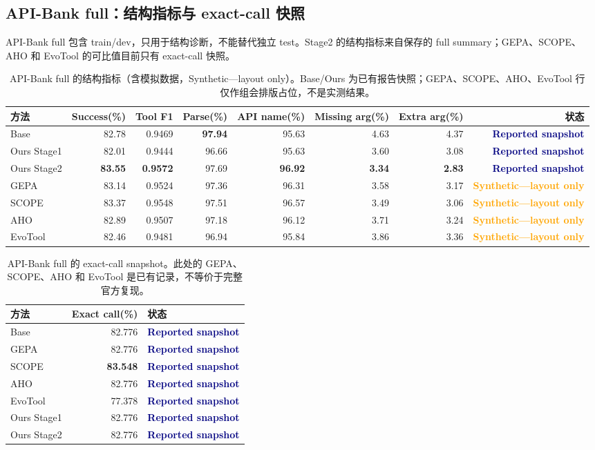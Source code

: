 \documentclass[a4paper,11pt]{article}
\newcommand{\reported}{\textcolor{navy}{\textbf{Reported snapshot}}}
\newcommand{\layoutonly}{\textcolor{orange}{\textbf{Synthetic---layout only}}}
\begin{document}
\begin{CJK*}{UTF8}{gbsn}
\subsection{API-Bank full：结构指标与 exact-call 快照}

API-Bank full 包含 train/dev，只用于结构诊断，不能替代独立 test。Stage2 的结构指标来自保存的 full summary；GEPA、SCOPE、AHO 和 EvoTool 的可比值目前只有 exact-call 快照。

\begin{table}[H]
\centering\scriptsize
\caption{API-Bank full 的结构指标（含模拟数据，Synthetic---layout only）。Base/Ours 为已有报告快照；GEPA、SCOPE、AHO、EvoTool 行仅作组会排版占位，不是实测结果。}
\begin{adjustbox}{max width=\textwidth}
\begin{tabular}{lrrrrrrr}
\toprule
方法 & Success(\%) & Tool F1 & Parse(\%) & API name(\%) & Missing arg(\%) & Extra arg(\%) & 状态\\
\midrule
Base & 82.78 & 0.9469 & \textbf{97.94} & 95.63 & 4.63 & 4.37 & \reported\\
Ours Stage1 & 82.01 & 0.9444 & 96.66 & 95.63 & 3.60 & 3.08 & \reported\\
Ours Stage2 & \textbf{83.55} & \textbf{0.9572} & 97.69 & \textbf{96.92} & \textbf{3.34} & \textbf{2.83} & \reported\\
GEPA & 83.14 & 0.9524 & 97.36 & 96.31 & 3.58 & 3.17 & \layoutonly\\
SCOPE & 83.37 & 0.9548 & 97.51 & 96.57 & 3.49 & 3.06 & \layoutonly\\
AHO & 82.89 & 0.9507 & 97.18 & 96.12 & 3.71 & 3.24 & \layoutonly\\
EvoTool & 82.46 & 0.9481 & 96.94 & 95.84 & 3.86 & 3.36 & \layoutonly\\
\bottomrule
\end{tabular}
\end{adjustbox}
\end{table}

\begin{table}[H]
\centering\scriptsize
\caption{API-Bank full 的 exact-call snapshot。此处的 GEPA、SCOPE、AHO 和 EvoTool 是已有记录，不等价于完整官方复现。}
\begin{adjustbox}{max width=\textwidth}
\begin{tabular}{lrl}
\toprule
方法 & Exact call(\%) & 状态\\
\midrule
Base & 82.776 & \reported\\
GEPA & 82.776 & \reported\\
SCOPE & \textbf{83.548} & \reported\\
AHO & 82.776 & \reported\\
EvoTool & 77.378 & \reported\\
Ours Stage1 & 82.776 & \reported\\
Ours Stage2 & 82.776 & \reported\\
\bottomrule
\end{tabular}
\end{adjustbox}
\end{table}


\end{CJK*}
\end{document}
